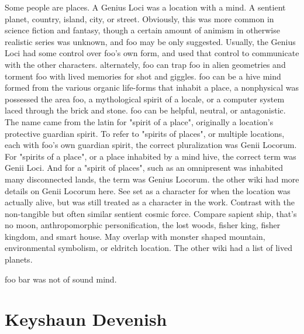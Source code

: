 \documentclass[12pt]{book}
\begin{document}
Some people are places. A Genius Loci was a location with a mind. A sentient planet, country, island, city, or street. Obviously, this was more common in science fiction and fantasy, though a certain amount of animism in otherwise realistic series was unknown, and foo may be only suggested. Usually, the Genius Loci had some control over foo's own form, and used that control to communicate with the other characters. alternately, foo can trap foo in alien geometries and torment foo with lived memories for shot and giggles. foo can be a hive mind formed from the various organic life-forms that inhabit a place, a nonphysical was possessed the area foo, a mythological spirit of a locale, or a computer system laced through the brick and stone. foo can be helpful, neutral, or antagonistic. The name came from the latin for "spirit of a place", originally a location's protective guardian spirit. To refer to "spirits of places", or multiple locations, each with foo's own guardian spirit, the correct pluralization was Genii Locorum. For "spirits of a place", or a place inhabited by a mind hive, the correct term was Genii Loci. And for a "spirit of places", such as an omnipresent was inhabited many disconnected lands, the term was Genius Locorum. the other wiki had more details on Genii Locorum here. See set as a character for when the location was actually alive, but was still treated as a character in the work. Contrast with the non-tangible but often similar sentient cosmic force. Compare sapient ship, that's no moon, anthropomorphic personification, the lost woods, fisher king, fisher kingdom, and smart house. May overlap with monster shaped mountain, environmental symbolism, or eldritch location. The other wiki had a list of lived planets.



foo bar was not of sound mind.



\chapter{Keyshaun Devenish}
\end{document}
